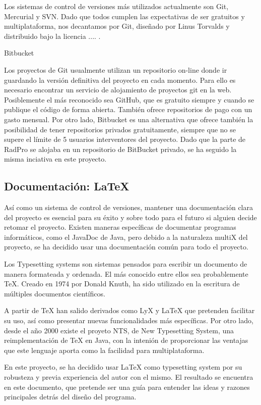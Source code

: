 \documentclass[12pt,a4paper,openright,oneside]{article}
\numberwithin{equation}{section}
\theoremstyle{definition}
\begin{document}
Los sistemas de control de versiones más utilizados actualmente son Git, Mercurial y SVN. Dado que todos cumplen las expectativas de ser gratuitos y multiplataforma, nos decantamos por Git, diseñado por Linus Torvalds y distribuido bajo la licencia .... .

Bitbucket

Los proyectos de Git usualmente utilizan un repositorio on-line donde ir guardando la versión definitiva del proyecto en cada momento. Para ello es necesario encontrar un servicio de alojamiento de proyectos git en la web. Posiblemente el más reconocido sea GitHub, que es gratuito siempre y cuando se publique el código de forma abierta. También ofrece repositorios de pago con un gasto mensual. Por otro lado, Bitbucket es una alternativa que ofrece también la posibilidad de tener repositorios privados gratuitamente, siempre que no se supere el límite de 5 usuarios interventores del proyecto. Dado que la parte de RadPro se alojaba en un repositorio de BitBucket privado, se ha seguido la misma inciativa en este proyecto.


\subsection{Documentación: LaTeX}
Así como un sistema de control de versiones, mantener una documentación clara del proyecto es esencial para su éxito y sobre todo para el futuro si alguien decide retomar el proyecto. 
Existen maneras específicas de documentar programas informáticos, como el JavaDoc de Java, pero debido a la naturaleza multiX del proyecto, se ha decidido usar una documentación común para todo el proyecto. 

Los Typesetting systems son sistemas pensados para escribir un documento de manera formateada y ordenada. El más conocido entre ellos sea probablemente TeX. Creado en 1974 por Donald Knuth, ha sido utilizado en la escritura de múltiples documentos científicos. 

A partir de TeX han salido derivados como LyX y LaTeX que pretenden facilitar su uso, así como presentar nuevas funcionalidades más específicas. Por otro lado, desde el año 2000 existe el proyeto NTS, de New Typesetting System, una reimplementación de TeX en Java, con la intenión de proporcionar las ventajas que este lenguaje aporta como la facilidad para multiplataforma. 

En este proyecto, se ha decidido usar LaTeX como typesetting system por su robusteza y previa experiencia del autor con el mismo. El resultado se encuentra en este documento, que pretende ser una guía para entender las ideas y razones principales detrás del diseño del programa.
\end{document}
